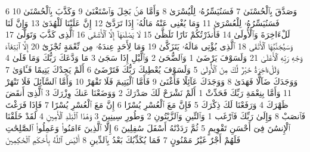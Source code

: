 {\tiny\colorbox{cl_aya}{6}} وَصَدَّقَ بِٱلْحُسْنَىٰ
{\tiny\colorbox{cl_aya}{7}} فَسَنُيَسِّرُهُۥ لِلْيُسْرَىٰ
{\tiny\colorbox{cl_aya}{8}} وَأَمَّا مَنۢ بَخِلَ وَٱسْتَغْنَىٰ
{\tiny\colorbox{cl_aya}{9}} وَكَذَّبَ بِٱلْحُسْنَىٰ
{\tiny\colorbox{cl_aya}{10}} فَسَنُيَسِّرُهُۥ لِلْعُسْرَىٰ
{\tiny\colorbox{cl_aya}{11}} وَمَا يُغْنِى عَنْهُ مَالُهُۥٓ إِذَا تَرَدَّىٰٓ
{\tiny\colorbox{cl_aya}{12}} إِنَّ عَلَيْنَا لَلْهُدَىٰ
{\tiny\colorbox{cl_aya}{13}} وَإِنَّ لَنَا لَلْءَاخِرَةَ وَٱلْأُولَىٰ
{\tiny\colorbox{cl_aya}{14}} فَأَنذَرْتُكُمْ نَارًا تَلَظَّىٰ
{\tiny\colorbox{cl_aya}{15}} لَا يَصْلَىٰهَآ إِلَّا ٱلْأَشْقَى
{\tiny\colorbox{cl_aya}{16}} ٱلَّذِى كَذَّبَ وَتَوَلَّىٰ
{\tiny\colorbox{cl_aya}{17}} وَسَيُجَنَّبُهَا ٱلْأَتْقَى
{\tiny\colorbox{cl_aya}{18}} ٱلَّذِى يُؤْتِى مَالَهُۥ يَتَزَكَّىٰ
{\tiny\colorbox{cl_aya}{19}} وَمَا لِأَحَدٍ عِندَهُۥ مِن نِّعْمَةٍ تُجْزَىٰٓ
{\tiny\colorbox{cl_aya}{20}} إِلَّا ٱبْتِغَآءَ وَجْهِ رَبِّهِ ٱلْأَعْلَىٰ
{\tiny\colorbox{cl_aya}{21}} وَلَسَوْفَ يَرْضَىٰ
{\tiny\colorbox{cl_aya}{1}} وَٱلضُّحَىٰ
{\tiny\colorbox{cl_aya}{2}} وَٱلَّيْلِ إِذَا سَجَىٰ
{\tiny\colorbox{cl_aya}{3}} مَا وَدَّعَكَ رَبُّكَ وَمَا قَلَىٰ
{\tiny\colorbox{cl_aya}{4}} وَلَلْءَاخِرَةُ خَيْرٌ لَّكَ مِنَ ٱلْأُولَىٰ
{\tiny\colorbox{cl_aya}{5}} وَلَسَوْفَ يُعْطِيكَ رَبُّكَ فَتَرْضَىٰٓ
{\tiny\colorbox{cl_aya}{6}} أَلَمْ يَجِدْكَ يَتِيمًا فَـَٔاوَىٰ
{\tiny\colorbox{cl_aya}{7}} وَوَجَدَكَ ضَآلًّا فَهَدَىٰ
{\tiny\colorbox{cl_aya}{8}} وَوَجَدَكَ عَآئِلًا فَأَغْنَىٰ
{\tiny\colorbox{cl_aya}{9}} فَأَمَّا ٱلْيَتِيمَ فَلَا تَقْهَرْ
{\tiny\colorbox{cl_aya}{10}} وَأَمَّا ٱلسَّآئِلَ فَلَا تَنْهَرْ
{\tiny\colorbox{cl_aya}{11}} وَأَمَّا بِنِعْمَةِ رَبِّكَ فَحَدِّثْ
{\tiny\colorbox{cl_aya}{1}} أَلَمْ نَشْرَحْ لَكَ صَدْرَكَ
{\tiny\colorbox{cl_aya}{2}} وَوَضَعْنَا عَنكَ وِزْرَكَ
{\tiny\colorbox{cl_aya}{3}} ٱلَّذِىٓ أَنقَضَ ظَهْرَكَ
{\tiny\colorbox{cl_aya}{4}} وَرَفَعْنَا لَكَ ذِكْرَكَ
{\tiny\colorbox{cl_aya}{5}} فَإِنَّ مَعَ ٱلْعُسْرِ يُسْرًا
{\tiny\colorbox{cl_aya}{6}} إِنَّ مَعَ ٱلْعُسْرِ يُسْرًا
{\tiny\colorbox{cl_aya}{7}} فَإِذَا فَرَغْتَ فَٱنصَبْ
{\tiny\colorbox{cl_aya}{8}} وَإِلَىٰ رَبِّكَ فَٱرْغَب
{\tiny\colorbox{cl_aya}{1}} وَٱلتِّينِ وَٱلزَّيْتُونِ
{\tiny\colorbox{cl_aya}{2}} وَطُورِ سِينِينَ
{\tiny\colorbox{cl_aya}{3}} وَهَٰذَا ٱلْبَلَدِ ٱلْأَمِينِ
{\tiny\colorbox{cl_aya}{4}} لَقَدْ خَلَقْنَا ٱلْإِنسَٰنَ فِىٓ أَحْسَنِ تَقْوِيمٍ
{\tiny\colorbox{cl_aya}{5}} ثُمَّ رَدَدْنَٰهُ أَسْفَلَ سَٰفِلِينَ
{\tiny\colorbox{cl_aya}{6}} إِلَّا ٱلَّذِينَ ءَامَنُوا۟ وَعَمِلُوا۟ ٱلصَّٰلِحَٰتِ فَلَهُمْ أَجْرٌ غَيْرُ مَمْنُونٍ
{\tiny\colorbox{cl_aya}{7}} فَمَا يُكَذِّبُكَ بَعْدُ بِٱلدِّينِ
{\tiny\colorbox{cl_aya}{8}} أَلَيْسَ ٱللَّهُ بِأَحْكَمِ ٱلْحَٰكِمِينَ

